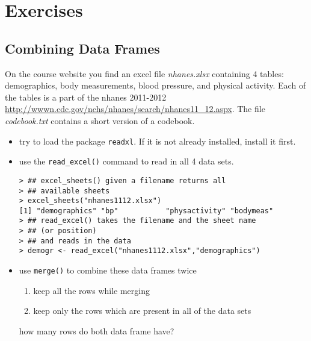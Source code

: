 \documentclass[11pt]{article}
\begin{document}
\section{Exercises}
\subsection{Combining Data Frames}
On the course website you find an excel file \emph{nhanes.xlsx} containing 4 tables: demographics, body measurements, blood pressure, and physical activity. Each of the tables is a part of the nhanes 2011-2012 \url{http://wwwn.cdc.gov/nchs/nhanes/search/nhanes11_12.aspx}. The file \emph{codebook.txt} contains a short version of a codebook.
\begin{itemize}
\item try to load the package \texttt{readxl}. If it is not already installed, install it first.
\item use the \texttt{read\_excel()} command to read in all 4 data sets.\footnotesize
\begin{verbatim}
> ## excel_sheets() given a filename returns all 
> ## available sheets 
> excel_sheets("nhanes1112.xlsx")
[1] "demographics" "bp"           "physactivity" "bodymeas"    
> ## read_excel() takes the filename and the sheet name 
> ## (or position)
> ## and reads in the data 
> demogr <- read_excel("nhanes1112.xlsx","demographics")
\end{verbatim}
\item use \texttt{merge()} to combine these data frames twice
  \begin{enumerate}
  \item keep all the rows while merging
  \item keep only the rows which are present in all of the data sets
  \end{enumerate}
  how many rows do both data frame have?
\end{itemize}
\end{document}
